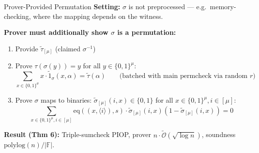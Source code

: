 \documentclass[aspectratio=169,10pt]{beamer}
\newcommand{\F}{\mathbb{F}}
\newcommand{\B}{\{0,1\}}
\newcommand{\eq}{\mathrm{eq}}
\newcommand{\wt}[1]{\widetilde{#1}}
\newcommand{\bigO}{\mathcal{O}}
\newcommand{\polylog}{\mathrm{polylog}}
\begin{document}
\begin{frame}{Prover-Provided Permutation}
\textbf{Setting:} $\sigma$ is not preprocessed --- e.g.\ memory-checking, where the mapping depends on the witness.

\vspace{0.5em}
\textbf{Prover must additionally show $\sigma$ is a permutation:}

\begin{enumerate}
  \item Provide $\wt{\tau}_{[\mu]}$ (claimed $\sigma^{-1}$)
  \item Prove $\tau(\sigma(y)) = y$ for all $y \in \B^\mu$:
    \[
      \sum_{x \in \B^\mu} x \cdot \wt{1}_\sigma(x, \alpha) = \wt{\tau}(\alpha) \qquad \text{(batched with main permcheck via random $r$)}
    \]
  \item Prove $\sigma$ maps to binaries: $\wt{\sigma}_{[\mu]}(i, x) \in \{0,1\}$ for all $x \in \B^\mu, i \in [\mu]$:
    \[
      \sum_{x \in \B^\mu, i \in [\mu]} \eq((x, \langle i \rangle), s) \cdot \wt{\sigma}_{[\mu]}(i,x)(1 - \wt{\sigma}_{[\mu]}(i,x)) = 0
    \]
\end{enumerate}

\vspace{0.3em}
\textbf{Result (Thm 6):} Triple-sumcheck PIOP, prover $n \cdot \widetilde{\bigO}(\sqrt{\log n})$, soundness $\polylog(n)/|\F|$.
\end{frame}
\end{document}
